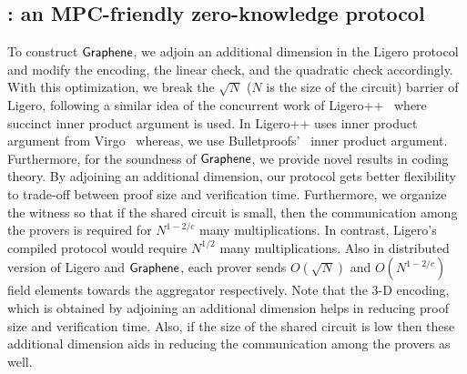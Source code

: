 \subsection{\name{}: an MPC-friendly zero-knowledge protocol}
To construct $\textsf{Graphene}$, we adjoin an additional dimension in the Ligero protocol and modify the encoding, the linear check, and the quadratic check accordingly. With this optimization, we break the $\sqrt{N}$ ($N$ is the size of the circuit) barrier of Ligero, following a similar idea of the concurrent work of Ligero++~\cite{ligero++} where succinct inner product argument is used. In Ligero++ uses inner product argument from Virgo~\cite{Virgo} whereas, we use Bulletproofs'~\cite{bulletproofs} inner product argument. Furthermore, for the soundness of $\textsf{Graphene}$, we provide novel results in coding theory. By adjoining an additional dimension, our protocol gets better flexibility to trade-off between proof size and verification time. Furthermore, we organize the witness so that if the shared circuit is small, then the communication among the provers is required for $N^{1-2/c}$ many multiplications. In contrast, Ligero's compiled protocol would require $N^{1/2}$ many multiplications. Also in distributed version of Ligero and $\textsf{Graphene}$, each prover sends $O(\sqrt{N})$ and $O(N^{1-2/c})$ field elements towards the aggregator respectively. Note that the 3-D encoding, which is obtained by adjoining an additional dimension helps in reducing proof size and verification time. Also, if the size of the shared circuit is low then these additional dimension aids in reducing the communication among the provers as well. 
